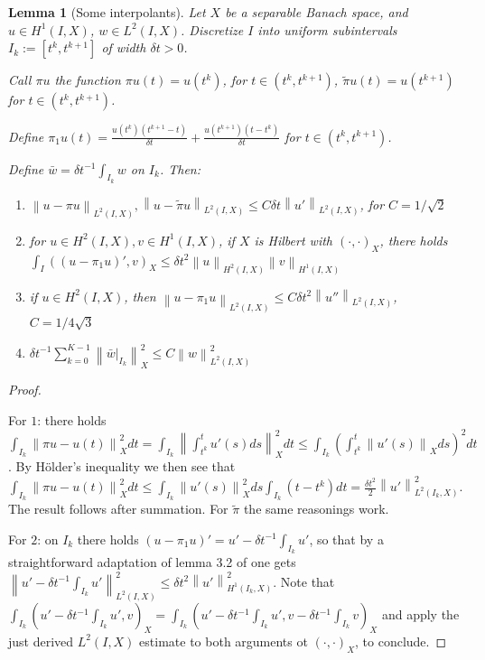\documentclass[english,a4paper,9pt,oneside]{scrbook}	%
\theoremstyle{break}
\newtheorem{lemma}[equation]{Lemma}
\newenvironment{mproof}[1][\proofname]{%
  \begin{proof}[#1]$ $\par\nobreak\ignorespaces
}{%
  \end{proof}
}
\renewcommand*{\proofname}{Proof}
\theoremstyle{remark}
\newcommand{\ds}{\displaystyle}
\newcommand{\norm}[1]{\left\lVert#1\right\rVert}
\begin{document}
\begin{appendices}
\begin{lemma}[Some interpolants]
\label{lemma:pw_constant_appr}
Let $X$ be a separable Banach space, and $u \in H^1(I,X)$, $w \in L^2(I,X)$. Discretize $I$ into uniform subintervals $I_k:=[t^k,t^{k+1}]$ of width $\delta t>0$.

Call $\pi u $ the function $\pi u(t)=u(t^{k})$, for $t \in (t^k,t^{k+1})$, $\tilde{\pi}u(t) = u(t^{k+1})$ for $t \in (t^k,t^{k+1})$.

Define $\ds \pi_1 u(t) = \frac{u(t^k)(t^{k+1}-t)}{\delta t} + \frac{u(t^{k+1})(t-t^k)}{\delta t}$ for $t \in (t^k,t^{k+1})$.

Define $\ds \bar{w} = \delta t^{-1}\int_{I_k}w$ on $I_k$. Then:

\begin{enumerate}
	\item $\norm{u-\pi u}_{L^2(I,X)}, \norm{u-\tilde{\pi }u}_{L^2(I,X)}\leq C \delta t \norm{u'}_{L^2(I,X)}$, for $C=1/\sqrt{2}$
	\item for $u \in H^2(I,X), v \in H^1(I,X)$, if $X$ is Hilbert with $(\cdot, \cdot)_X$, there holds $\ds \int_I ((u-\pi_1 u)',v)_X \leq \delta t^2 \norm{u}_{H^2(I,X)}\norm{v}_{H^1(I,X)} $
	\item if $u \in H^2(I,X)$, then $\norm{u-\pi_1 u}_{L^2(I,X)}\leq C\delta t^2\norm{u''}_{L^2(I,X)}$, $C = 1/4\sqrt{3}$
	\item $\ds \delta t^{-1} \sum_{k=0}^{K-1}\norm{\bar{w}|_{I_k}}_X^2\leq C \norm{w}_{L^2(I,X)}^2$
\end{enumerate}

\end{lemma}

\begin{mproof}
For $1$: there holds $\ds \int_{I_k}\norm{\pi u - u(t)}_X^2 dt = \int_{I_k} \norm{\int_{t^k}^{t} u'(s)ds}_X^2 dt\leq \int_{I_k}\left ( \int_{t^k}^{t} \norm{u'(s)}_X ds \right )^2 dt$. 
By Hölder's inequality we then see that $ \ds \int_{I_k}\norm{\pi u - u(t)}_X^2 dt \leq  \int_{I_k} \norm{u'(s)}_X^2 ds  \int_{I_k}(t-t^k)dt = \frac{\delta t ^2}{2} \norm{u'}_{L^2(I_k,X)}^2$. The result follows after summation. For $\tilde{\pi}$ the same reasonings work.

For $2$: on $I_k$ there holds $(u-\pi_1 u)' = u'-\delta t^{-1}\ds \int_{I_k} u'$, so that by a straightforward adaptation of lemma 3.2 of \cite{lshou} one gets $\norm{u'-\delta t^{-1}\ds \int_{I_k} u'}_{L^2(I,X)}^2\leq \delta t^2 \norm{u'}_{H^1(I_k,X)}^2$. Note that $\ds \int_{I_k} \left ( u' - \delta t^{-1} \int_{I_k}u', v\right )_X = \int_{I_k} \left ( u' - \delta t^{-1} \int_{I_k}u', v - \delta t^{-1} \int_{I_k}v\right )_X$ and apply the just derived $L^2(I,X)$ estimate to both arguments ot $(\cdot,\cdot)_X$, to conclude.


\end{mproof}
\end{appendices}
\end{document}
